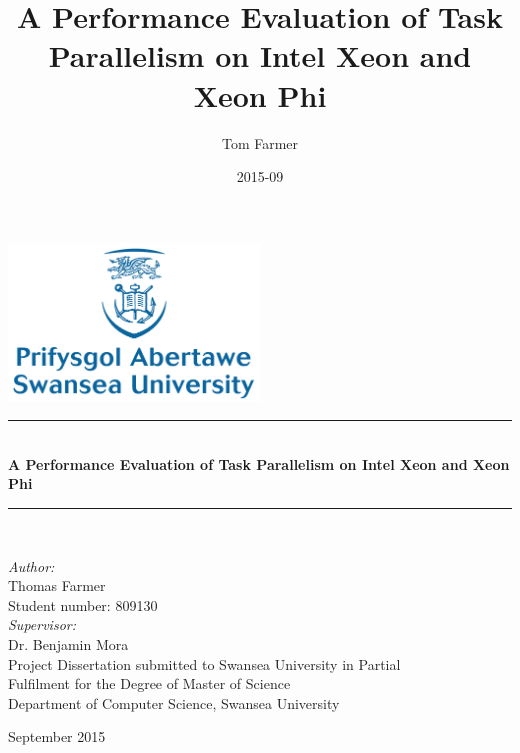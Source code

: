 \documentclass{report}
\title{A Performance Evaluation of Task Parallelism on Intel Xeon and Xeon Phi}
\date{2015-09}
\author{Tom Farmer}
\begin{document}

\begin{titlepage}
\begin{center}
\newcommand{\HRule}{\rule{\linewidth}{0.5mm}}
\includegraphics[width=0.5\textwidth]{./SwanseaLogo}~\\[1cm]

\HRule \\[0.4cm]
{ 
\huge \bfseries A Performance Evaluation of Task Parallelism on Intel Xeon and Xeon Phi \\[0.4cm]
}

\HRule \\[1.5cm]

\begin{center}

\noindent
\emph{\large Author:}\\[0.1cm]
{\Large Thomas Farmer}\\[0.1cm]
Student number: 809130\\[0.5cm]
\emph{\large Supervisor:} \\[0.1cm]
{\Large Dr. Benjamin Mora}\\[6.0cm]

Project Dissertation submitted to Swansea University in Partial\\ Fulfilment for the Degree of Master of Science\\[0.5cm]

Department of Computer Science, Swansea University

\end{center}

\vfill

{\large September 2015}

\end{center}

\clearpage

\end{titlepage}
\end{document}
